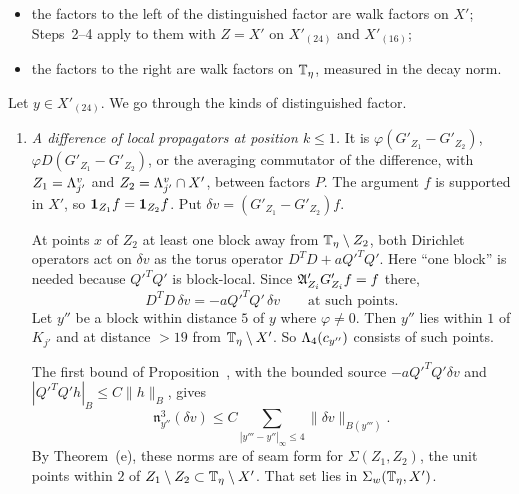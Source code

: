 \begin{detail}
\begin{step}[Seams]
\begin{itemize}
\item the factors to the left of the distinguished factor are walk factors on $X'$; Steps~2--4 apply to them with $Z=X'$ on $X'_{(24)}$ and $X'_{(16)}$;
\item the factors to the right are walk factors on $\mathbb T_\eta$, measured in the decay norm.
\end{itemize}
Let $y\in X'_{(24)}$. We go through the kinds of distinguished factor.
\begin{enumerate}[label=(\roman*)]
\item \emph{A difference of local propagators at position $k\le1$.} It is $\varphi(G'_{Z_1}-G'_{Z_2})$, $\varphi D(G'_{Z_1}-G'_{Z_2})$, or the averaging commutator of the difference, with $Z_1=\Lambda^v_{j'}$ and $Z_2=\Lambda^v_{j'}\cap X'$, between factors $P$. The argument $f$ is supported in $X'$, so $\mathbf 1_{Z_1}f=\mathbf 1_{Z_2}f$. Put $\delta v=(G'_{Z_1}-G'_{Z_2})f$.

At points $x$ of $Z_2$ at least one block away from $\mathbb T_\eta\setminus Z_2$, both Dirichlet operators act on $\delta v$ as the torus operator $D^TD+aQ'^TQ'$. Here ``one block'' is needed because $Q'^TQ'$ is block-local. Since $\mathfrak A'_{Z_i}G'_{Z_i}f=f$ there,
\[
D^TD\,\delta v=-aQ'^TQ'\,\delta v\qquad\text{at such points.}
\]
Let $y''$ be a block within distance $5$ of $y$ where $\varphi\ne0$. Then $y''$ lies within $1$ of $K_{j'}$ and at distance $>19$ from $\mathbb T_\eta\setminus X'$. So $\Lambda_4(c_{y''})$ consists of such points.

The first bound of Proposition~, with the bounded source $-aQ'^TQ'\delta v$ and $|Q'^TQ'h|_{B}\le C\|h\|_B$, gives
\[
\mathfrak n^3_{y''}(\delta v)\le C\sum_{|y'''-y''|_\infty\le4}\|\delta v\|_{B(y''')}.
\]
By Theorem~(e), these norms are of seam form for $\Sigma(Z_1,Z_2)$, the unit points within $2$ of $Z_1\setminus Z_2\subset\mathbb T_\eta\setminus X'$. That set lies in $\Sigma_w(\mathbb T_\eta,X')$.


\end{enumerate}
\end{step}
\end{detail}
